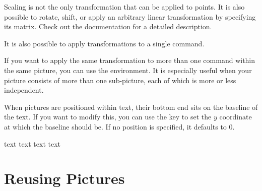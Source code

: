 Scaling is not the only transformation that can be applied to points. It is
also possible to rotate, shift, or apply an arbitrary linear transformation by
specifying its matrix. Check out the documentation for a detailed description.
\begin{example}
\end{example}
It is also possible to apply transformations to a single command.
\begin{example}
\end{example}
If you want to apply the same transformation to more than one command within
the same picture, you can use the  environment. It is especially useful
when your picture consists of more than one sub-picture, each of which is more
or less independent.
\begin{example}[vertical_mode, examplewidth=0.7\linewidth]
\end{example}

When \TikZ{} pictures are positioned within text, their bottom end sits on the
baseline of the text. If you want to modify this, you can use the  key
to set the \(y\) coordinate at which the baseline should be. If no position is
specified, it defaults to \(0\).
\begin{example}[vertical_mode, examplewidth=0.8\linewidth]
text 
text 
text  text
\end{example}

\section{Reusing Pictures}

